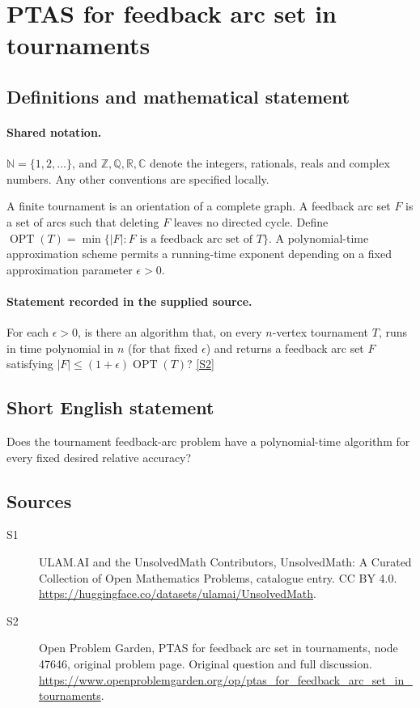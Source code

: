 \documentclass[11pt]{article}
\newcommand{\sref}[2]{\hyperlink{source:#1:#2}{[S#2]}}
\begin{document}
\section{PTAS for feedback arc set in tournaments}\label{statement}

\subsection{Definitions and mathematical statement}

\paragraph{Shared notation.}$\mathbb N=\{1,2,\ldots\}$, and $\mathbb Z,\mathbb Q,\mathbb R,\mathbb C$ denote the integers, rationals, reals and complex numbers. Any other conventions are specified locally.


A finite tournament is an orientation of a complete graph. A feedback arc set $F$ is a set of arcs such that deleting $F$ leaves no directed cycle. Define $\operatorname{OPT}(T)=\min\{|F|:F\text{ is a feedback arc set of }T\}$. A polynomial-time approximation scheme permits a running-time exponent depending on a fixed approximation parameter $\epsilon>0$.
\paragraph{Statement recorded in the supplied source.}
For each $\epsilon>0$, is there an algorithm that, on every $n$-vertex tournament $T$, runs in time polynomial in $n$ (for that fixed $\epsilon$) and returns a feedback arc set $F$ satisfying $|F|\leq(1+\epsilon)\operatorname{OPT}(T)$? \sref{statement}{2}
\subsection{Short English statement}
Does the tournament feedback-arc problem have a polynomial-time algorithm for every fixed desired relative accuracy?
\subsection{Sources}
\begin{description}
\item[\hypertarget{source:statement:1}{S1}] ULAM.AI and the UnsolvedMath Contributors, UnsolvedMath: A Curated Collection of Open Mathematics Problems, catalogue entry. CC BY 4.0. \url{https://huggingface.co/datasets/ulamai/UnsolvedMath}.
\item[\hypertarget{source:statement:2}{S2}] Open Problem Garden, PTAS for feedback arc set in tournaments, node 47646, original problem page. Original question and full discussion. \url{https://www.openproblemgarden.org/op/ptas_for_feedback_arc_set_in_tournaments}.

\end{description}
\label{end:statement}
\end{document}
